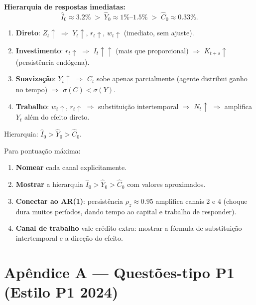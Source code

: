 \documentclass[12pt, a4paper]{article}
\begin{document}
\textbf{Hierarquia de respostas imediatas:}
\[
\hat{I}_0 \approx 3.2\% \;>\; \hat{Y}_0 \approx 1\%\text{--}1.5\% \;>\; \hat{C}_0 \approx 0.33\%.
\]

\begin{resultbox}[title={Quatro Canais de Transmissão do Choque PTF (Q8)}]
\begin{enumerate}
\item \textbf{Direto}: $Z_t\uparrow$ $\Rightarrow$ $Y_t\uparrow$, $r_t\uparrow$, $w_t\uparrow$ (imediato, sem ajuste).
\item \textbf{Investimento}: $r_t\uparrow$ $\Rightarrow$ $I_t\uparrow\uparrow$ (mais que proporcional) $\Rightarrow$ $K_{t+s}\uparrow$ (persistência endógena).
\item \textbf{Suavização}: $Y_t\uparrow$ $\Rightarrow$ $C_t$ sobe apenas parcialmente (agente distribui ganho no tempo) $\Rightarrow$ $\sigma(C) < \sigma(Y)$.
\item \textbf{Trabalho}: $w_t\uparrow$, $r_t\uparrow$ $\Rightarrow$ substituição intertemporal $\Rightarrow$ $N_t\uparrow$ $\Rightarrow$ amplifica $Y_t$ além do efeito direto.
\end{enumerate}
Hierarquia: $\hat{I}_0 > \hat{Y}_0 > \hat{C}_0$.
\end{resultbox}

\begin{provabox}[title={Q8 / P1 2024 Dissertativa --- Pontuação Máxima}]
Para pontuação máxima:
\begin{enumerate}
\item \textbf{Nomear} cada canal explicitamente.
\item \textbf{Mostrar} a hierarquia $\hat{I}_0 > \hat{Y}_0 > \hat{C}_0$ com valores aproximados.
\item \textbf{Conectar ao AR(1)}: persistência $\rho_z \approx 0.95$ amplifica canais 2 e 4 (choque dura muitos períodos, dando tempo ao capital e trabalho de responder).
\item \textbf{Canal de trabalho} vale crédito extra: mostrar a fórmula de substituição intertemporal e a direção do efeito.
\end{enumerate}
\end{provabox}

\appendix

\section*{Apêndice A --- Questões-tipo P1 (Estilo P1 2024)}
\end{document}
